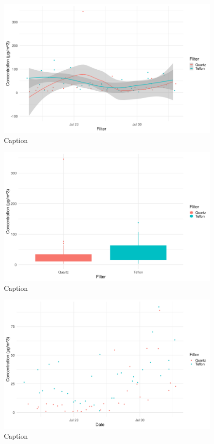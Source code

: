 \documentclass{nwureport}
\begin{document}
\begin{figure}[!htb]
    \centering
    \includegraphics[width=\textwidth]{images/pm25_winter_jittersmooth.png}
    \caption{Caption}
    \label{fig:pm2.5_winter_jitter_smooth}
\end{figure}

\begin{figure}[!htb]
    \centering
    \includegraphics[width=\textwidth]{images/pm25_winter_box_filter.png}
    \caption{Caption}
    \label{fig:pm2.5_winter_box}
\end{figure}

\begin{figure}[!htb]
    \centering
    \includegraphics[width=\textwidth]{images/pm10_winter_jitter.png}
    \caption{Caption}
    \label{fig:pm10_winter_jitter}
\end{figure}
\end{document}
